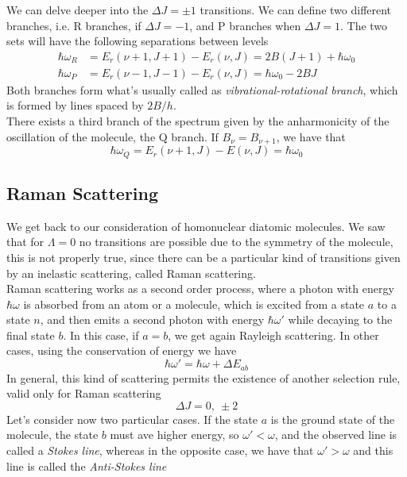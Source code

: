 \documentclass[../qm.tex]{subfiles}
\begin{document}
	We can delve deeper into the $\Delta J=\pm1$ transitions. We can define two different branches, i.e. R branches, if $\Delta J=-1$, and P branches when $\Delta J=1$. The two sets will have the following separations between levels
	\begin{equation}
		\begin{aligned}
			\hbar\omega_{R}&=E_r(\nu+1,J+1)-E_r(\nu,J)=2B(J+1)+\hbar\omega_0\\
			\hbar\omega_{P}&=E_r(\nu-1,J-1)-E_r(\nu,J)=\hbar\omega_0-2BJ
		\end{aligned}
		\label{eq:RPbranches}
	\end{equation}
	Both branches form what's usually called as \textit{vibrational-rotational branch}, which is formed by lines spaced by $2B/h$.\\
	There exists a third branch of the spectrum given by the anharmonicity of the oscillation of the molecule, the Q branch. If $B_\nu=B_{\nu+1}$, we have that
	\begin{equation}
		\hbar\omega_Q=E_r(\nu+1,J)-E(\nu,J)=\hbar\omega_0
		\label{eq:Qbranch}
	\end{equation}
	\subsection{Raman Scattering}
	We get back to our consideration of homonuclear diatomic molecules. We saw that for $\Lambda=0$ no transitions are possible due to the symmetry of the molecule, this is not properly true, since there can be a particular kind of transitions given by an inelastic scattering, called Raman scattering.\\
	Raman scattering works as a second order process, where a photon with energy $\hbar\omega$ is absorbed from an atom or a molecule, which is excited from a state $a$ to a state $n$, and then emits a second photon with energy $\hbar\omega'$ while decaying to the final state $b$. In this case, if $a=b$, we get again Rayleigh scattering. In other cases, using the conservation of energy we have
	\begin{equation}
		\hbar\omega'=\hbar\omega+\Delta E_{ab}
		\label{eq:ramanfrequency}
	\end{equation}
	In general, this kind of scattering permits the existence of another selection rule, valid only for Raman scattering
	\begin{equation}
		\Delta J=0,\ \pm2
		\label{eq:deltaJramans}
	\end{equation}
	Let's consider now two particular cases. If the state $a$ is the ground state of the molecule, the state $b$ must ave higher energy, so $\omega'<\omega$, and the observed line is called a \textit{Stokes line}, whereas in the opposite case, we have that $\omega'>\omega$ and this line is called the \textit{Anti-Stokes line}\\
\end{document}
